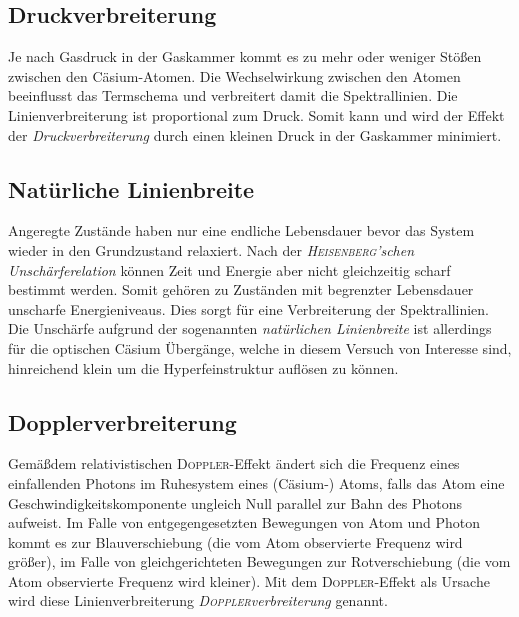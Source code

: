 \documentclass[../bericht.tex]{subfiles}
\begin{document}
      \subsection{Druckverbreiterung}
      \label{subsec:druckverbreiterung}

        Je nach Gasdruck in der Gaskammer kommt es zu mehr oder weniger Stößen zwischen den
        Cäsium-Atomen. Die Wechselwirkung zwischen den Atomen beeinflusst das Termschema und
        verbreitert damit die Spektrallinien. Die Linienverbreiterung ist proportional zum Druck. Somit kann und wird der Effekt der \textit{Druckverbreiterung} durch einen kleinen Druck in der Gaskammer minimiert.


      \subsection{Natürliche Linienbreite}
      \label{subsec:natueliche-linienbreite}

        Angeregte Zustände haben nur eine endliche Lebensdauer bevor das System wieder in den Grundzustand relaxiert. Nach der \textit{\textsc{Heisenberg}'schen Unschärferelation} können Zeit und Energie aber nicht gleichzeitig scharf bestimmt werden. Somit gehören zu Zuständen mit begrenzter Lebensdauer unscharfe Energieniveaus. Dies sorgt für eine Verbreiterung der Spektrallinien. Die Unschärfe aufgrund der sogenannten \textit{natürlichen Linienbreite} ist allerdings für die optischen Cäsium Übergänge, welche in diesem Versuch von Interesse sind, hinreichend klein um die Hyperfeinstruktur auflösen zu können.


      \subsection{Dopplerverbreiterung}
      \label{subsec:dopplerverbreiterung}

        Gemä\ss dem relativistischen \textsc{Doppler}-Effekt ändert sich die Frequenz eines einfallenden Photons im Ruhesystem eines (Cäsium-) Atoms, falls das Atom eine Geschwindigkeitskomponente ungleich Null parallel zur Bahn des Photons aufweist. Im Falle von entgegengesetzten Bewegungen von Atom und Photon kommt es zur Blauverschiebung (die vom Atom observierte Frequenz wird größer), im Falle von gleichgerichteten Bewegungen zur Rotverschiebung (die vom Atom observierte Frequenz wird kleiner). Mit dem \textsc{Doppler}-Effekt als Ursache wird diese Linienverbreiterung \textit{\textsc{Doppler}verbreiterung} genannt.
\end{document}
